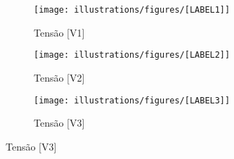 \begin{figure}[H]
	\centering
	\caption{Gráfico para tensões de [FASE] [TIPOS]}
	\begin{subfigure}{16cm}
		\centering
		\texttt{[image: illustrations/figures/[LABEL1]]}
		\caption{Tensão [V1]}
	\end{subfigure}
  \begin{subfigure}{16cm}
		\centering
		\texttt{[image: illustrations/figures/[LABEL2]]}
		\caption{Tensão [V2]}
	\end{subfigure}
  \begin{subfigure}{16cm}
		\centering
		\texttt{[image: illustrations/figures/[LABEL3]]}
		\caption{Tensão [V3]}
	\end{subfigure}
\end{figure}
